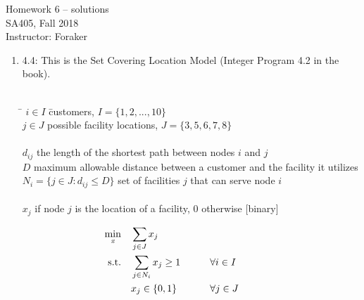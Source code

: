 \documentclass[10pt]{article}
\begin{document}
\begin{center}
  {\sc Homework 6 -- solutions}\\
  {\sc SA405, Fall 2018} \\
  {\sc Instructor: Foraker}
\end{center}

\medskip

\begin{enumerate} 
\item 4.4: This is the Set Covering Location Model (Integer Program 4.2 in the book).

\begin{tabbing}
\\[0.2cm]
\hspace*{.5cm} \= $i\in I$ \hspace{2.8cm} \= customers, $I=\{1,2,...,10\}$ \\
\> $j\in J$ \> possible facility locations, $J=\{3,5,6,7,8\}$\\[0.2cm]
\\[0.2cm] 
\> $d_{ij}$ \> the length of the shortest path between nodes $i$ and $j$ \\
\> $D$ \> maximum allowable distance between a customer and the facility it utilizes\\
\> $N_i = \{ j \in J: d_{ij} \le D \}$ \> set of facilities $j$ that can serve node $i$ \\[0.2cm]
\\[0.2cm] 
\> $x_j$  if node $j$ is the location of a facility, 0 otherwise  [binary] \\[0.2cm] 
\end{tabbing}
\begin{alignat}{3}
\min_{ \tiny{\it x}} \quad & \sum_{j\in J} x_j \\
\mbox{s.t.} \quad & \sum_{j\in N_i} x_j \ge 1 &\qquad&  \forall i \in I &\qquad& \\
 & x_j \in \{0,1\} && \forall j\in J
\end{alignat}


\end{enumerate}
\end{document}
